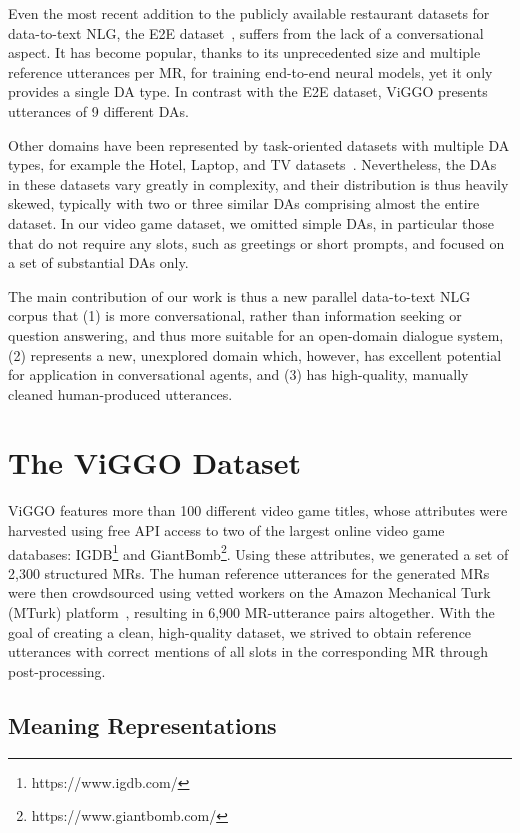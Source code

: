 \documentclass[11pt,a4paper]{article}
\begin{document}
Even the most recent addition to the publicly available restaurant datasets for data-to-text NLG, the E2E dataset~\cite{novikova2017e2e}, suffers from the lack of a conversational aspect. It has become popular, thanks to its unprecedented size and multiple reference utterances per MR, for training end-to-end neural models, yet it only provides a single DA type. In contrast with the E2E dataset, ViGGO presents utterances of 9 different DAs.

Other domains have been represented by task-oriented datasets with multiple DA types, for example the Hotel, Laptop, and TV datasets~\cite{wen2015semantically,wen2016multi}. Nevertheless, the DAs in these datasets vary greatly in complexity, and their distribution is thus heavily skewed, typically with two or three similar DAs comprising almost the entire dataset. In our video game dataset, we omitted simple DAs, in particular those that do not require any slots, such as greetings or short prompts, and focused on a set of substantial DAs only.

The main contribution of our work is thus a new parallel data-to-text NLG corpus that (1) is more conversational, rather than information seeking or question answering, and thus more suitable for an open-domain dialogue system, (2) represents a new, unexplored domain which, however, has excellent potential for application in conversational agents, and (3) has high-quality, manually cleaned human-produced utterances.



\section{The ViGGO Dataset}


ViGGO features more than 100 different video game titles, whose attributes were harvested using free API access to two of the largest online video game databases: IGDB\footnote{https://www.igdb.com/} and GiantBomb\footnote{https://www.giantbomb.com/}. Using these attributes, we generated a set of 2,300 structured MRs. The human reference utterances for the generated MRs were then crowdsourced using vetted workers on the Amazon Mechanical Turk (MTurk) platform~\cite{buhrmester2011amazon}, resulting in 6,900 MR-utterance pairs altogether. With the goal of creating a clean, high-quality dataset, we strived to obtain reference utterances with correct mentions of all slots in the corresponding MR through post-processing.


\subsection{Meaning Representations}
\label{sec:meaning_representations}
\end{document}
